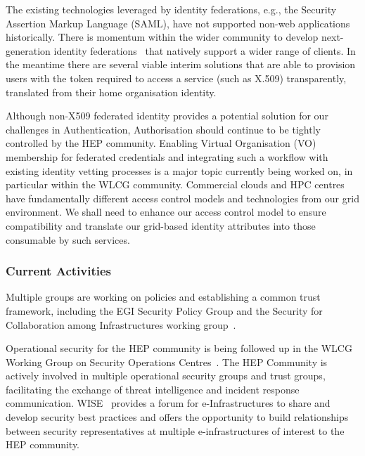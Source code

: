 The existing technologies leveraged by identity federations, e.g., the
Security Assertion Markup Language (SAML), have not supported non-web
applications historically. There is momentum within the wider community
to develop next-generation identity federations~\cite{OICFederation}
that natively support a
wider range of clients. In the meantime there are several viable interim
solutions that are able to provision users with the token required to
access a service (such as X.509) transparently, translated from their
home organisation identity.

Although non-X509 federated identity provides a potential solution for our
challenges in Authentication, Authorisation should continue to be
tightly controlled by the HEP community. Enabling Virtual Organisation
(VO) membership for federated credentials and integrating such a
workflow with existing identity vetting processes is a major topic
currently being worked on, in particular within the WLCG community.
Commercial clouds and HPC centres have fundamentally different access
control models and technologies from our grid environment. We shall need
to enhance our access control model to ensure compatibility and
translate our grid-based identity attributes into those consumable by
such services.

\subsubsection*{Current Activities}

Multiple groups are working on policies and establishing a common trust
framework, including the EGI Security Policy Group
\cite{EGISecurityPolicyGroup} and the Security for Collaboration among
Infrastructures working group~\cite{SCI_WG}.

Operational security for the HEP community is being followed up in the
WLCG Working Group on Security Operations Centres~\cite{WLCG-SOC-WG}. The
HEP Community is actively involved in multiple operational security
groups and trust groups, facilitating the exchange of threat
intelligence and incident response communication. WISE~\cite{WISE}
provides a forum for e-Infrastructures to share and develop security
best practices and offers the opportunity to build relationships between
security representatives at multiple e-infrastructures of interest to
the HEP community.

